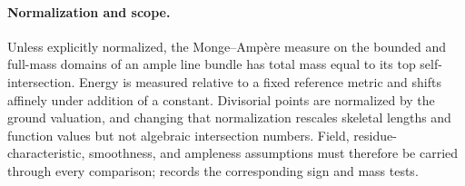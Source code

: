 \paragraph{Normalization and scope.}
\label{front:part3-normalization-and-scope}
Unless explicitly normalized, the Monge--Amp\`ere measure on the bounded
and full-mass domains of an ample line bundle has total mass equal to its
top self-intersection. Energy is measured
relative to a fixed reference metric and shifts affinely under addition of a
constant.  Divisorial points are normalized by the ground valuation, and
changing that normalization rescales skeletal lengths and function values but
not algebraic intersection numbers.  Field, residue-characteristic,
smoothness, and ampleness assumptions must therefore be carried through every
comparison;  records the corresponding sign and mass
tests.
